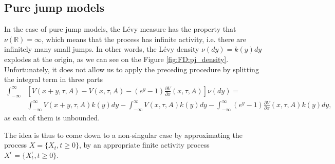 \subsection{Pure jump models}
In the case of pure jump models, the L\'evy measure has the property that $\nu(\mathbb{R})= \infty$, which means that the process has infinite activity, i.e. there are infinitely many small jumps. In other words, the L\'evy density $\nu(dy)=k(y)dy$ explodes at the origin, as we can see on the Figure \ref{fig:FD:pj_density}. Unfortunately, it does not allow us to apply the preceding procedure by splitting the integral term in three parts
\begin{align*}
\int_{-\infty}^\infty &\left[V(x+y,\tau,A)-V(x,\tau,A)-\left(e^y-1\right)\frac{\partial V}{\partial x}(x,\tau,A)\right]\nu(dy) = \\
&\int_{-\infty}^\infty V(x+y,\tau,A)k(y) dy -\int_{-\infty}^\infty V(x,\tau,A)k(y)dy-\int_{-\infty}^\infty\left(e^y-1\right)\frac{\partial V}{\partial x}(x,\tau,A)k(y)dy,
\end{align*}
as each of them is unbounded.

The idea is thus to come down to a non-singular case by approximating the process $X = \{X_t, t\geq 0\}$, by an appropriate finite activity process $X^\epsilon =\{X_t^\epsilon,t\geq0\}$.

